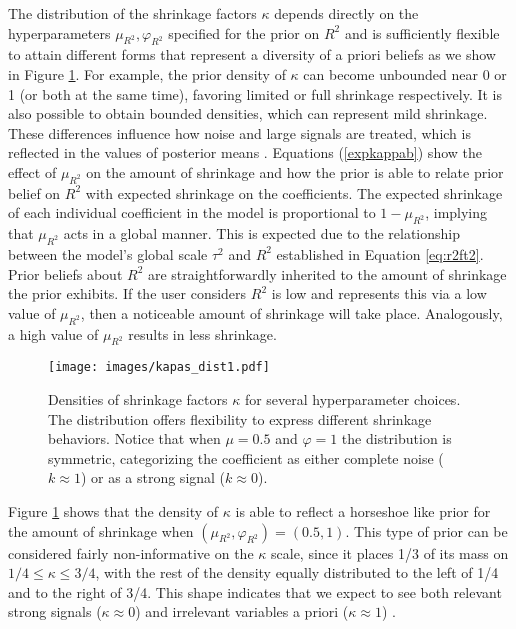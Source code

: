 The distribution of the shrinkage factors $\kappa$ depends directly on the hyperparameters $\mu_{R^2}, \varphi_{R^2}$ specified for the prior on $R^2$ and is sufficiently flexible to attain different forms that represent a diversity of a priori beliefs as we show in Figure \ref{fig:kappa_dist2}. For example, the prior density of $\kappa$ can become unbounded near 0 or 1 (or both at the same time), favoring limited or full shrinkage respectively. It is also possible to obtain bounded densities, which can represent mild shrinkage. These differences influence how noise and large signals are treated, which is reflected in the values of posterior means \citep{Horseshoe}. Equations (\ref{expkappab}) show the effect of $\mu_{R^2}$ on the amount of shrinkage and how the prior is able to relate prior belief on $R^2$ with expected shrinkage on the coefficients. The expected shrinkage of each individual coefficient in the model is proportional to $1-\mu_{R^2}$, implying that $\mu_{R^2}$ acts in a global manner. This is expected due to the relationship between the model's global scale $\tau^2$ and $R^2$ established in Equation \eqref{eq:r2ft2}. Prior beliefs about $R^2$ are straightforwardly inherited to the amount of shrinkage the prior exhibits. If the user considers $R^2$ is low and represents this via a low value of $\mu_{R^2}$, then a noticeable amount of shrinkage will take place. Analogously, a high value of $\mu_{R^2}$ results in less shrinkage.
 \begin{figure}[t!]%
	\centering
  	\texttt{[image: images/kapas\_dist1.pdf]}
	\caption{Densities of shrinkage factors $\kappa$ for several hyperparameter choices. The distribution offers  flexibility to express different shrinkage behaviors. Notice that when $\mu=0.5$ and $\varphi=1$ the distribution is symmetric, categorizing the coefficient as either complete noise ($k\approx 1$) or as a strong signal ($k\approx 0$).  }
	\label{fig:kappa_dist2}
\end{figure}

Figure \ref{fig:kappa_dist2} shows that the density of $\kappa$ is able to reflect a horseshoe like prior for the amount of shrinkage when $(\mu_{R^2}, \varphi_{R^2})=(0.5,1)$. This type of prior can be considered fairly non-informative on the $\kappa$ scale, since it places 1/3 of its mass on $1/4 \leq \kappa \leq 3/4$, with  the rest of the density equally distributed to the left of 1/4 and to the right of 3/4. This shape indicates that we expect to see both relevant strong signals ($\kappa \approx 0$) and irrelevant variables a priori ($\kappa \approx 1$) \citep{Horseshoe, PiironenHorseshoe}.

